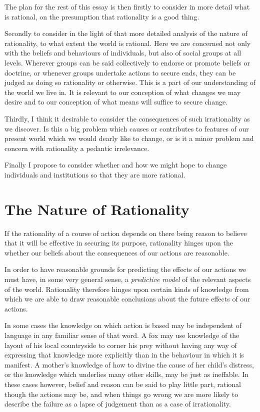 The plan for the rest of this essay is then firstly to consider in more detail what is rational, on the presumption that rationality is a good thing.

Secondly to consider in the light of that more detailed analysis of the nature of rationality, to what extent the world is rational.
Here we are concerned not only with the beliefs and behaviours of individuals, but also of social groups at all levels.
Wherever groups can be said collectively to endorse or promote beliefs or doctrine, or whenever groups undertake actions to secure ends, they can be judged as doing so rationality or otherwise.
This is a part of our understanding of the world we live in.
It is relevant to our conception of what changes we may desire and to our conception of what means will suffice to secure change.

Thirdly, I think it desirable to consider the consequences of such irrationality as we discover.
Is this a big problem which causes or contributes to features of our present world which we would dearly like to change, or is it a minor problem and concern with rationality a pedantic irrelevance.

Finally I propose to consider whether and how we might hope to change individuals and institutions so that they are more rational.

\section{The Nature of Rationality}

If the rationality of a course of action depends on there being reason to believe that it will be effective in securing its purpose, rationality hinges upon the whether our beliefs about the consequences of our actions are reasonable.

In order to have reasonable grounds for predicting the effects of our actions we must have, in some very general sense, a {\it predictive model} of the relevant aspects of the world.
Rationality therefore hinges upon certain kinds of knowledge from which we are able to draw reasonable conclusions about the future effects of our actions.

In some cases the knowledge on which action is based may be independent of language in any familiar sense of that word.
A fox may use knowledge of the layout of his local countryside to corner his prey without having any way of expressing that knowledge more explicitly than in the behaviour in which it is manifest.
A mother's knowledge of how to divine the cause of her child's distress, or the knowledge which underlies many other skills, may be just as ineffable.
In these cases however, belief and reason can be said to play little part, rational though the actions may be, and when things go wrong we are more likely to describe the failure as a lapse of judgement than as a case of irrationality.


